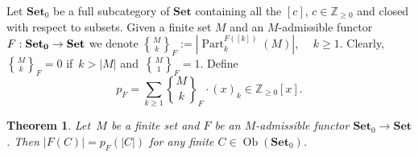 \documentclass[12pt, reqno]{amsart}
\newcommand{\stirling}[2]{\genfrac{\{}{\}}{0pt}0{#1}{#2}}
\newcommand{\tstirling}[2]{\genfrac{\{}{\}}{0pt}1{#1}{#2}}
\newtheorem{theorem}{Theorem}[section]
\theoremstyle{definition}
\numberwithin{equation}{section}
\newcommand{\ZZ}{{\mathbb Z}}
\DeclareMathOperator*{\Ob}{Ob}
\DeclareMathOperator{\Part}{Part}
\begin{document}
Let $\mathbf{Set}_0$ be a full subcategory of $\mathbf{Set}$ containing all the $[c]$, $c\in \ZZ_{\ge 0}$ and closed with respect to subsets.
Given a finite set $M$ and an $M$-admissible functor $F:{\bf Set_0}\to \mathbf{Set}$  we denote
${\tstirling{M}{k}}_F:=|\Part_k^{F([k])}(M)|$, $\quad k\ge 1$. Clearly, $\tstirling{M}{k}_F=0$ if~$k>|M|$
and~$\tstirling{M}{1}_F=1$. Define
$$
p_F=  \displaystyle\sum\limits _{k\ge 1}  {\stirling{M}{k}}_F\cdot (x)_k\in \ZZ_{\ge 0}[x].
$$



\begin{theorem}
\label{th:polynomial} 
Let~$M$ be a finite set and $F$ be an $M$-admissible functor $\mathbf{Set}_0\to \mathbf{Set}$. Then
$|F(C)|=p_F(|C|)$ 
for any finite $C\in \Ob(\mathbf{Set}_0)$.
\end{theorem}
\end{document}
